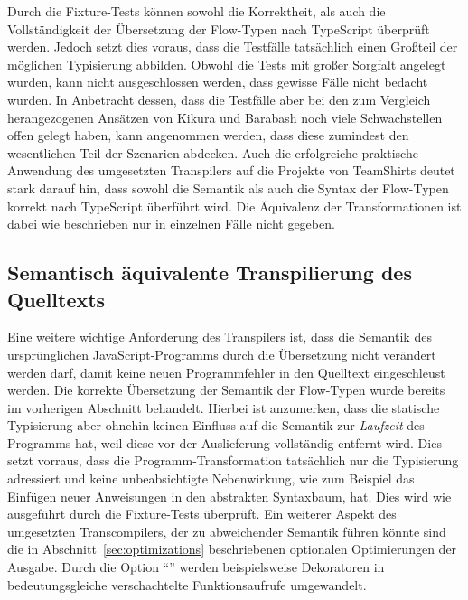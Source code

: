 Durch die Fixture-Tests können sowohl die Korrektheit, als auch die Vollständigkeit der Übersetzung der Flow-Typen nach TypeScript überprüft werden. Jedoch setzt dies voraus, dass die Testfälle tatsächlich einen Großteil der möglichen Typisierung abbilden. Obwohl die Tests mit großer Sorgfalt angelegt wurden, kann nicht ausgeschlossen werden, dass gewisse Fälle nicht bedacht wurden. In Anbetracht dessen, dass die Testfälle aber bei den zum Vergleich herangezogenen Ansätzen von Kikura und Barabash noch viele Schwachstellen offen gelegt haben, kann angenommen werden, dass diese zumindest den wesentlichen Teil der Szenarien abdecken. Auch die erfolgreiche praktische Anwendung des umgesetzten Transpilers auf die Projekte von TeamShirts deutet stark darauf hin, dass sowohl die Semantik als auch die Syntax der Flow-Typen korrekt nach TypeScript überführt wird. Die Äquivalenz der Transformationen ist dabei wie beschrieben nur in einzelnen Fälle nicht gegeben.

\subsection{Semantisch äquivalente Transpilierung des Quelltexts}

Eine weitere wichtige Anforderung des Transpilers ist, dass die Semantik des ursprünglichen JavaScript-Programms durch die Übersetzung nicht verändert werden darf, damit keine neuen Programmfehler in den Quelltext eingeschleust werden. Die korrekte Übersetzung der Semantik der Flow-Typen wurde bereits im vorherigen Abschnitt behandelt. Hierbei ist anzumerken, dass die statische Typisierung aber ohnehin keinen Einfluss auf die Semantik zur \emph{Laufzeit} des Programms hat, weil diese vor der Auslieferung vollständig entfernt wird. Dies setzt vorraus, dass die Programm-Transformation tatsächlich nur die Typisierung adressiert und keine unbeabsichtigte Nebenwirkung, wie zum Beispiel das Einfügen neuer Anweisungen in den abstrakten Syntaxbaum, hat. Dies wird wie ausgeführt durch die Fixture-Tests überprüft. Ein weiterer Aspekt des umgesetzten Transcompilers, der zu abweichender Semantik führen könnte sind die in Abschnitt~\ref{sec:optimizations} beschriebenen optionalen Optimierungen der Ausgabe. Durch die Option \enquote{} werden beispielsweise Dekoratoren in bedeutungsgleiche verschachtelte Funktionsaufrufe umgewandelt.

